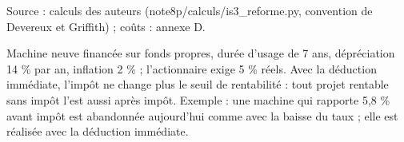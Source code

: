 Source : calculs des auteurs (note8p/calculs/is3\_reforme.py, convention de Devereux et Griffith) ; coûts : annexe D.\par Machine neuve financée sur fonds propres, durée d'usage de 7 ans, dépréciation 14 \% par an, inflation 2 \% ; l'actionnaire exige 5 \% réels. Avec la déduction immédiate, l'impôt ne change plus le seuil de rentabilité : tout projet rentable sans impôt l'est aussi après impôt. Exemple : une machine qui rapporte 5,8 \% avant impôt est abandonnée aujourd'hui comme avec la baisse du taux ; elle est réalisée avec la déduction immédiate.
